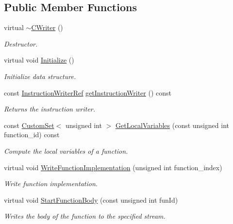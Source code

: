 \subsection*{Public Member Functions}
\begin{DoxyCompactItemize}
\item 
virtual \hyperlink{classCWriter_a4ce9be952a91f3422313a5f9faf60d99}{$\sim$\+C\+Writer} ()
\begin{DoxyCompactList}\small\item\em Destructor. \end{DoxyCompactList}\item 
virtual void \hyperlink{classCWriter_a7b57fdc8a06f368a65c03af147834198}{Initialize} ()
\begin{DoxyCompactList}\small\item\em Initialize data structure. \end{DoxyCompactList}\item 
const \hyperlink{instruction__writer_8hpp_a40ea26c38a2909ba48f88f997144b260}{Instruction\+Writer\+Ref} \hyperlink{classCWriter_a6a794a93c30937aa0ce70de98f5bb8c7}{get\+Instruction\+Writer} () const
\begin{DoxyCompactList}\small\item\em Returns the instruction writer. \end{DoxyCompactList}\item 
const \hyperlink{custom__set_8hpp_a615bc2f42fc38a4bb1790d12c759e86f}{Custom\+Set}$<$ unsigned int $>$ \hyperlink{classCWriter_aad06f4f569e3a651b401c963b1dcada8}{Get\+Local\+Variables} (const unsigned int function\+\_\+id) const
\begin{DoxyCompactList}\small\item\em Compute the local variables of a function. \end{DoxyCompactList}\item 
virtual void \hyperlink{classCWriter_a3a050cfd9987eb7a7227865cf40db91d}{Write\+Function\+Implementation} (unsigned int function\+\_\+index)
\begin{DoxyCompactList}\small\item\em Write function implementation. \end{DoxyCompactList}\item 
virtual void \hyperlink{classCWriter_a10dc0cac6629dd939842250345feb477}{Start\+Function\+Body} (const unsigned int fun\+Id)
\begin{DoxyCompactList}\small\item\em Writes the body of the function to the specified stream. \end{DoxyCompactList}\item 

\end{DoxyCompactItemize}
